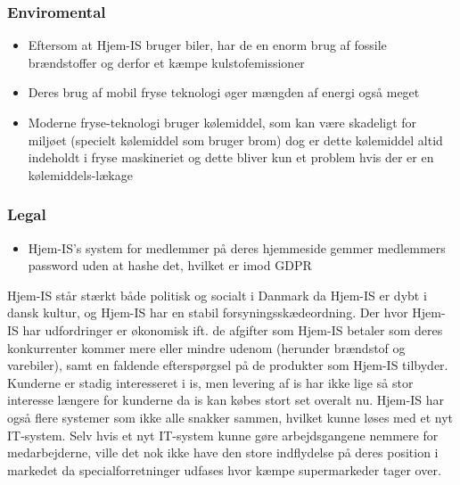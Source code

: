 \subsubsection{Enviromental}
\begin{itemize}
    \item Eftersom at Hjem-IS bruger biler, har de en enorm brug af fossile brændstoffer og derfor et kæmpe kulstofemissioner
    \item Deres brug af mobil fryse teknologi øger mængden af energi også meget
    \item Moderne fryse-teknologi bruger kølemiddel, som kan være skadeligt for miljøet (specielt kølemiddel som bruger brom) dog er dette kølemiddel altid indeholdt i fryse maskineriet og dette bliver kun et problem hvis der er en kølemiddels-lækage \cite{Benhadid2012refrigerants}
\end{itemize}
\subsubsection{Legal}
\begin{itemize}
    \item Hjem-IS’s system for medlemmer på deres hjemmeside gemmer medlemmers password uden at hashe det, hvilket er imod GDPR 
\end{itemize}

Hjem-IS står stærkt både politisk og socialt i Danmark da Hjem-IS er dybt i dansk kultur, og Hjem-IS har en stabil forsyningsskædeordning. Der hvor Hjem-IS har udfordringer er økonomisk ift. de afgifter som Hjem-IS betaler som deres konkurrenter kommer mere eller mindre udenom (herunder brændstof og varebiler), samt en faldende efterspørgsel på de produkter som Hjem-IS tilbyder. Kunderne er stadig interesseret i is, men levering af is har ikke lige så stor interesse længere for kunderne da is kan købes stort set overalt nu. Hjem-IS har også flere systemer som ikke alle snakker sammen, hvilket kunne løses med et nyt IT-system. Selv hvis et nyt IT-system kunne gøre arbejdsgangene nemmere for medarbejderne, ville det nok ikke have den store indflydelse på deres position i markedet da specialforretninger udfases hvor kæmpe supermarkeder tager over.

